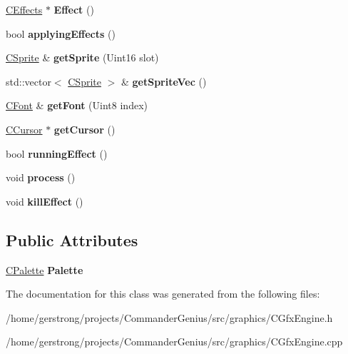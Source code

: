 \begin{DoxyCompactItemize}
\item 
\hypertarget{class_c_gfx_engine_a5b7159f66dde37cb25a8ca5fdc641a50}{
\hyperlink{class_c_effects}{CEffects} $\ast$ {\bfseries Effect} ()}
\label{class_c_gfx_engine_a5b7159f66dde37cb25a8ca5fdc641a50}

\item 
\hypertarget{class_c_gfx_engine_aae8ae18fda247a448383bbe0fbfe9b2b}{
bool {\bfseries applyingEffects} ()}
\label{class_c_gfx_engine_aae8ae18fda247a448383bbe0fbfe9b2b}

\item 
\hypertarget{class_c_gfx_engine_acde55ace71144fcb095f5218d5bcc331}{
\hyperlink{class_c_sprite}{CSprite} \& {\bfseries getSprite} (Uint16 slot)}
\label{class_c_gfx_engine_acde55ace71144fcb095f5218d5bcc331}

\item 
\hypertarget{class_c_gfx_engine_afef19fdcf0bfab3fc2b5bad44726be5d}{
std::vector$<$ \hyperlink{class_c_sprite}{CSprite} $>$ \& {\bfseries getSpriteVec} ()}
\label{class_c_gfx_engine_afef19fdcf0bfab3fc2b5bad44726be5d}

\item 
\hypertarget{class_c_gfx_engine_a71fbc005e8abe61afcc63e3e82f31087}{
\hyperlink{class_c_font}{CFont} \& {\bfseries getFont} (Uint8 index)}
\label{class_c_gfx_engine_a71fbc005e8abe61afcc63e3e82f31087}

\item 
\hypertarget{class_c_gfx_engine_afa0ae7592fceef64d770ef67a9dc5923}{
\hyperlink{class_c_cursor}{CCursor} $\ast$ {\bfseries getCursor} ()}
\label{class_c_gfx_engine_afa0ae7592fceef64d770ef67a9dc5923}

\item 
\hypertarget{class_c_gfx_engine_a402c0753039f45a2b9736fcb0f72092f}{
bool {\bfseries runningEffect} ()}
\label{class_c_gfx_engine_a402c0753039f45a2b9736fcb0f72092f}

\item 
\hypertarget{class_c_gfx_engine_a26467cad4e7da0af376e2191e975e91e}{
void {\bfseries process} ()}
\label{class_c_gfx_engine_a26467cad4e7da0af376e2191e975e91e}

\item 
\hypertarget{class_c_gfx_engine_a01073c22a7bc7731743a789b5000fb2f}{
void {\bfseries killEffect} ()}
\label{class_c_gfx_engine_a01073c22a7bc7731743a789b5000fb2f}

\end{DoxyCompactItemize}
\subsection*{Public Attributes}
\begin{DoxyCompactItemize}
\item 
\hypertarget{class_c_gfx_engine_a3cf619835303580d4ac64ec12fbbd83c}{
\hyperlink{class_c_palette}{CPalette} {\bfseries Palette}}
\label{class_c_gfx_engine_a3cf619835303580d4ac64ec12fbbd83c}

\end{DoxyCompactItemize}


The documentation for this class was generated from the following files:\begin{DoxyCompactItemize}
\item 
/home/gerstrong/projects/CommanderGenius/src/graphics/CGfxEngine.h\item 
/home/gerstrong/projects/CommanderGenius/src/graphics/CGfxEngine.cpp\end{DoxyCompactItemize}
